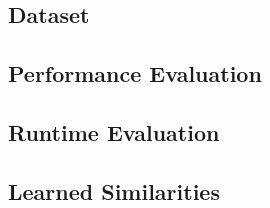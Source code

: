 \subsection{Dataset}


\subsection{Performance Evaluation}


\subsection{Runtime Evaluation}


\subsection{Learned Similarities}
